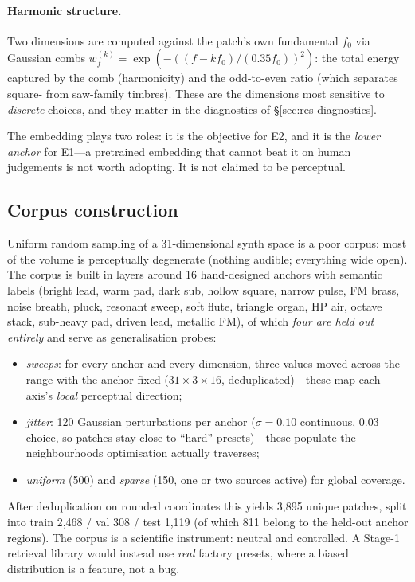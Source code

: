 \documentclass[11pt]{article}
\begin{document}
\paragraph{Harmonic structure.} Two dimensions are computed against the patch's
own fundamental $f_0$ via Gaussian combs
$w^{(k)}_f = \exp(-((f - k f_0)/(0.35 f_0))^2)$: the total energy captured by
the comb (harmonicity) and the odd-to-even ratio (which separates square- from
saw-family timbres). These are the dimensions most sensitive to \emph{discrete}
choices, and they matter in the diagnostics of \S\ref{sec:res-diagnostics}.

The embedding plays two roles: it is the objective for E2, and it is the
\emph{lower anchor} for E1---a pretrained embedding that cannot beat it on human
judgements is not worth adopting. It is not claimed to be perceptual.

\subsection{Corpus construction}\label{sec:corpus}

Uniform random sampling of a 31-dimensional synth space is a poor corpus: most
of the volume is perceptually degenerate (nothing audible; everything wide
open). The corpus is built in layers around 16 hand-designed anchors with
semantic labels (bright lead, warm pad, dark sub, hollow square, narrow pulse,
FM brass, noise breath, pluck, resonant sweep, soft flute, triangle organ, HP
air, octave stack, sub-heavy pad, driven lead, metallic FM), of which \emph{four
are held out entirely} and serve as generalisation probes:

\begin{itemize}
\item \emph{sweeps}: for every anchor and every dimension, three values moved
  across the range with the anchor fixed ($31 \times 3 \times 16$,
  deduplicated)---these map each axis's \emph{local} perceptual direction;
\item \emph{jitter}: 120 Gaussian perturbations per anchor
  ($\sigma = 0.10$ continuous, $0.03$ choice, so patches stay close to ``hard''
  presets)---these populate the neighbourhoods optimisation actually traverses;
\item \emph{uniform} (500) and \emph{sparse} (150, one or two sources active)
  for global coverage.
\end{itemize}

After deduplication on rounded coordinates this yields 3{,}895 unique patches,
split into train 2{,}468 / val 308 / test 1{,}119 (of which 811 belong to the
held-out anchor regions). The corpus is a scientific instrument: neutral and
controlled. A Stage-1 retrieval library would instead use \emph{real} factory
presets, where a biased distribution is a feature, not a bug.
\end{document}
